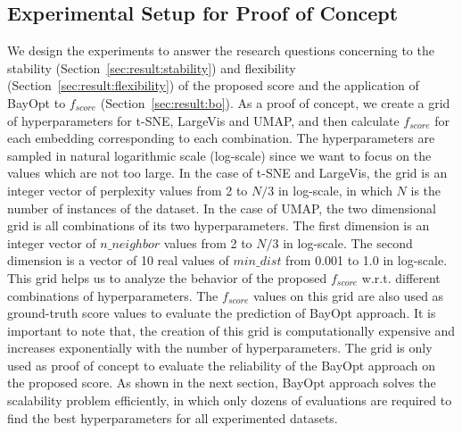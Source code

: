 \subsection{Experimental Setup for Proof of Concept}\label{sec:xp:proof}
We design the experiments to answer the research questions concerning to the stability (Section~\ref{sec:result:stability}) and flexibility (Section~\ref{sec:result:flexibility}) of the proposed score and the application of BayOpt to $f_{score}$ (Section~\ref{sec:result:bo}).
As a proof of concept, we create a grid of hyperparameters for t-SNE, LargeVis and UMAP, and then calculate $f_{score}$ for each embedding corresponding to each combination.
The hyperparameters are sampled in natural logarithmic scale (log-scale) since we want to focus on the values which are not too large.
In the case of t-SNE and LargeVis, the grid is an integer vector of perplexity values from 2 to $N/3$ in log-scale, in which $N$ is the number of instances of the dataset.
In the case of UMAP, the two dimensional grid is all combinations of its two hyperparameters.
The first dimension is an integer vector of $n\_neighbor$ values from 2 to $N/3$ in log-scale.
The second dimension is a vector of 10 real values of $min\_dist$ from 0.001 to 1.0 in log-scale.
This grid helps us to analyze the behavior of the proposed $f_{score}$ w.r.t. different combinations of hyperparameters.
The $f_{score}$ values on this grid are also used as ground-truth score values to evaluate the prediction of BayOpt approach.
It is important to note that, the creation of this grid is computationally expensive and increases exponentially with the number of hyperparameters.
The grid is only used as proof of concept to evaluate the reliability of the BayOpt approach on the proposed score.
As shown in the next section, BayOpt approach solves the scalability problem efficiently, in which only dozens of evaluations are required to find the best hyperparameters for all experimented datasets.

